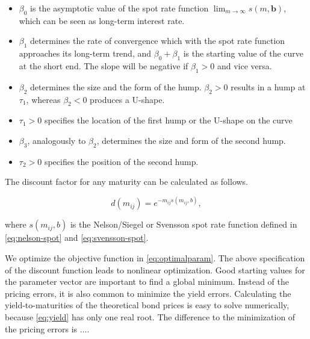 \begin{itemize}
\item $\beta_0$ is the asymptotic value of the spot rate function $\lim_{m\to\infty}s(m,\bm{b})$, which can be seen as long-term interest rate.
\item $\beta_1$ determines the rate of convergence which with the spot rate function approaches its long-term trend, and $\beta_0+\beta_1$ is the starting value of the curve at the short end. The slope will be negative if $\beta_1>0$ and vice versa.
\item $\beta_2$ determines the size and the form of the hump. $\beta_2 >0$  results in a hump at  $\tau_1$, whereas $\beta_2<0$ produces a U-shape.
\item $\tau_1>0$ specifies the location of the first hump or the U-shape on the curve
\item $\beta_3$, analogously to $\beta_2$, determines the size and form of the second hump.
\item $\tau_2>0$ specifies the position of the second hump.
\end{itemize}

The discount factor for any maturity can be calculated as follows. 

\begin{displaymath}
d(m_{ij})=e^{-m_{ij}s(m_{ij},b)},
\end{displaymath}

where $s(m_{ij},b)$ is the Nelson/Siegel or Svensson spot rate function defined in \eqref{eq:nelson-spot} and \eqref{eq:svensson-spot}.

We optimize the objective function in \eqref{eq:optimalparam}. The above specification of the discount function leads to nonlinear optimization. Good starting values for the parameter vector are important to find a global minimum. Instead of the pricing errors, it is also common to minimize the yield errors. Calculating the yield-to-maturities of the theoretical bond prices is easy to solve numerically, because \eqref{eq:yield} has only one real root. The difference to the minimization of the pricing errors is $\dots$.

